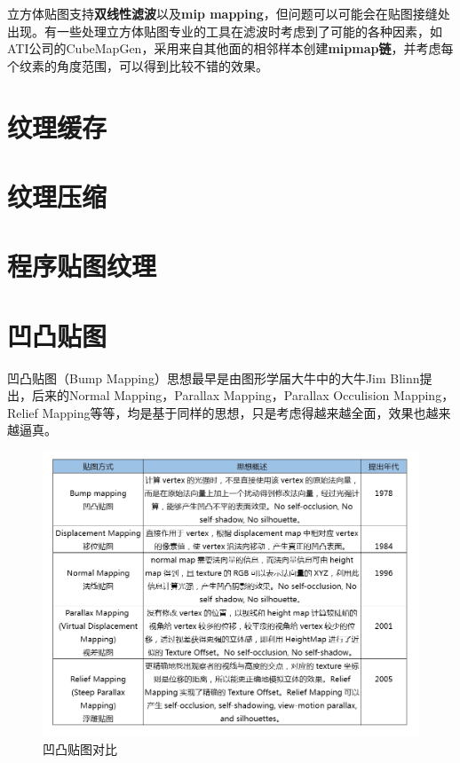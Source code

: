\documentclass[UTF8,a4paper,12pt]{ctexbook}
\begin{document}
		立方体贴图支持\textbf{双线性滤波}以及\textbf{mip mapping}，但问题可以可能会在贴图接缝处出现。有一些处理立方体贴图专业的工具在滤波时考虑到了可能的各种因素，如ATI公司的CubeMapGen，采用来自其他面的相邻样本创建\textbf{mipmap链}，并考虑每个纹素的角度范围，可以得到比较不错的效果。
				
	\section{纹理缓存}
	
	\section{纹理压缩}
	
	\section{程序贴图纹理}
	
	\section{凹凸贴图}
		凹凸贴图（Bump Mapping）思想最早是由图形学届大牛中的大牛Jim Blinn提出，后来的Normal Mapping，Parallax Mapping，Parallax Occulision Mapping，Relief Mapping等等，均是基于同样的思想，只是考虑得越来越全面，效果也越来越逼真。
		
		\begin{figure}[H]
			\centering
			\includegraphics[scale=0.53]{normMap}
			\caption{凹凸贴图对比}
		\end{figure}
		
\end{document}
